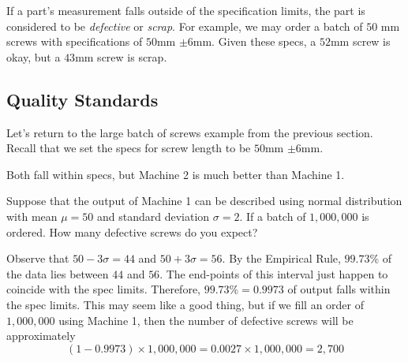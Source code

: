 \documentclass{ximera}
\begin{document}
\begin{center}
      \end{center}

If a part's measurement falls outside of the specification limits, the part is considered to be \emph{defective} or \emph{scrap}.  For example, we may order a batch of $50$ mm screws with specifications of $50$mm $\pm 6$mm.   Given these specs, a $52$mm screw is okay, but a $43$mm screw is scrap.

\subsection*{Quality Standards}
Let's return to the large batch of screws example from the previous section.  Recall that we set the specs for screw length to be $50$mm $\pm 6$mm.  

Both fall within specs, but Machine 2 is much better than Machine 1.

\begin{onlineOnly}
\begin{center} 
\end{center}
\end{onlineOnly}

\begin{example}\label{ex:defParts1}
    Suppose that the output of Machine 1 can be described using normal distribution with mean $\mu=50$ and standard deviation $\sigma=2$.  If a batch of $1,000,000$ is ordered.  How many defective screws do you expect?
    \begin{explanation}
        Observe that $50-3\sigma=44$ and $50+3\sigma=56$.  By the Empirical Rule, $99.73\%$ of the data lies between $44$ and $56$.  The end-points of this interval just happen to coincide with the spec limits.  Therefore, $99.73\%=0.9973$ of output falls within the spec limits.  This may seem like a good thing, but if we fill an order of $1,000,000$ using Machine 1, then the number of defective screws will be approximately
        $$(1-0.9973)\times 1,000,000=0.0027\times 1,000,000=2,700$$
        
    \end{explanation}
\end{example}
\end{document}

